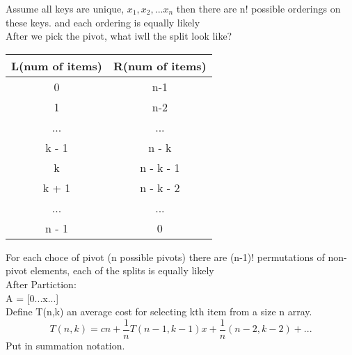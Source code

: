 \documentclass[12pt]{article}
\begin{document}
	Assume all keys are unique, $x_1, x_2,...x_n$ then there are n! possible orderings on these keys. and each ordering is equally likely\\
	
	After we pick the pivot, what iwll the split look like?\\
	\begin{tabular}{c | c}
		L(num of items) & R(num of items) \\ \hline
		0 & n-1 \\
		1 & n-2 \\
		... & ...\\
		k - 1 & n - k\\
		k & n - k - 1 \\
		k + 1 & n - k - 2\\
		... & ... \\
		n - 1 & 0 \\
	\end{tabular} 
	
	For each choce of pivot (n possible pivots) there are (n-1)! permutations of non-pivot elements, each of the splits is equally likely\\
	
	After Partiction:\\
	A = [0...x...]\\
	Define T(n,k) an average cost for selecting kth item from a size n array.\\
	
	$$T(n,k) = cn + \frac{1}{n}T(n-1, k-1)x + \frac{1}{n}(n-2, k-2) + ...$$
	Put in summation notation.\\
	
	
\end{document}
